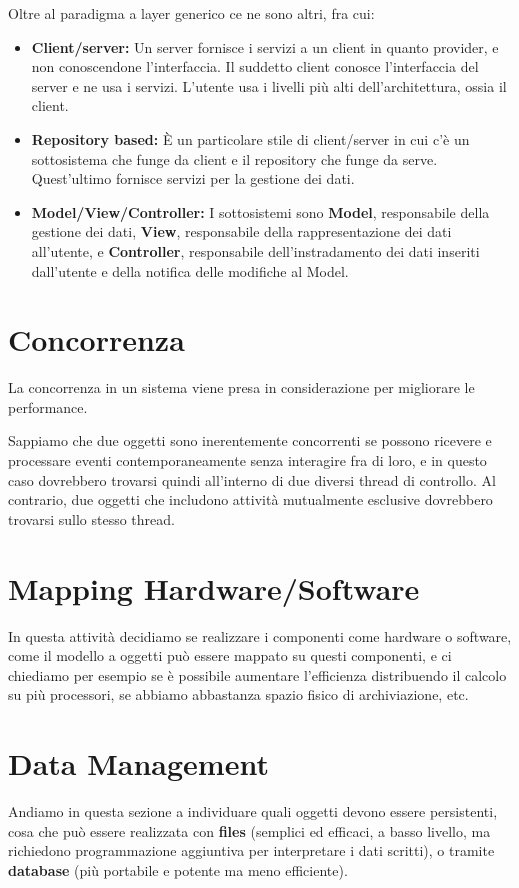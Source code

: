             Oltre al paradigma a layer generico ce ne sono altri, fra cui:
            \begin{itemize}
                \item \textbf{Client/server:} Un server fornisce i servizi a un client in quanto provider, e non conoscendone l'interfaccia. Il suddetto client conosce l'interfaccia del server e ne usa i servizi. L'utente usa i livelli più alti dell'architettura, ossia il client.
                \item \textbf{Repository based:} È un particolare stile di client/server in cui c'è un sottosistema che funge da client e il repository che funge da serve. Quest'ultimo fornisce servizi per la gestione dei dati.
                \item \textbf{Model/View/Controller:} I sottosistemi sono \textbf{Model}, responsabile della gestione dei dati, \textbf{View}, responsabile della rappresentazione dei dati all'utente, e \textbf{Controller}, responsabile dell'instradamento dei dati inseriti dall'utente e della notifica delle modifiche al Model.
            \end{itemize}
            
    \section{Concorrenza}
        La concorrenza in un sistema viene presa in considerazione per migliorare le performance.
        
        Sappiamo che due oggetti sono inerentemente concorrenti se possono ricevere e processare eventi contemporaneamente senza interagire fra di loro, e in questo caso dovrebbero trovarsi quindi all'interno di due diversi thread di controllo. Al contrario, due oggetti che includono attività mutualmente esclusive dovrebbero trovarsi sullo stesso thread.
        
    \section{Mapping Hardware/Software}
        In questa attività decidiamo se realizzare i componenti come hardware o software, come il modello a oggetti può essere mappato su questi componenti, e ci chiediamo per esempio se è possibile aumentare l'efficienza distribuendo il calcolo su più processori, se abbiamo abbastanza spazio fisico di archiviazione, etc.
        
    \section{Data Management}
        Andiamo in questa sezione a individuare quali oggetti devono essere persistenti, cosa che può essere realizzata con \textbf{files} (semplici ed efficaci, a basso livello, ma richiedono programmazione aggiuntiva per interpretare i dati scritti), o tramite \textbf{database} (più portabile e potente ma meno efficiente).
        
